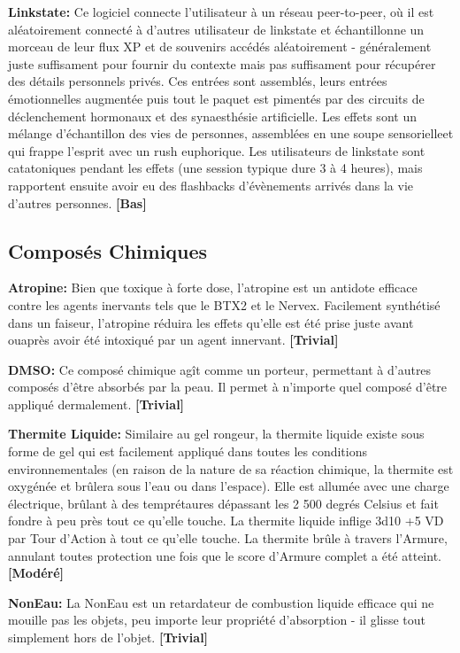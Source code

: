 \textbf{Linkstate:} Ce logiciel connecte l'utilisateur à un réseau peer-to-peer, où il est aléatoirement connecté à d'autres utilisateur de linkstate et échantillonne un morceau de leur flux XP et de souvenirs accédés aléatoirement - généralement juste suffisament pour fournir du contexte mais pas suffisament pour récupérer des détails personnels privés. Ces entrées sont assemblés, leurs entrées émotionnelles augmentée puis tout le paquet est pimentés par des circuits de déclenchement hormonaux et des synaesthésie artificielle. Les effets sont un mélange d'échantillon des vies de personnes, assemblées en une soupe sensorielleet qui frappe l'esprit avec un rush euphorique. Les utilisateurs de linkstate sont catatoniques pendant les effets (une session typique dure 3 à 4 heures), mais rapportent ensuite avoir eu des flashbacks d'évènements arrivés dans la vie d'autres personnes. \textbf{[Bas]} 

\subsection{Composés Chimiques} \label{sec:chemicals} 

\textbf{Atropine:} Bien que toxique à forte dose, l'atropine est un antidote efficace contre les agents inervants tels que le BTX2 et le Nervex. Facilement synthétisé dans un faiseur, l'atropine réduira les effets qu'elle est été prise juste avant ouaprès avoir été intoxiqué par un agent innervant. \textbf{[Trivial]} 

\textbf{DMSO:} Ce composé chimique agît comme un porteur, permettant à d'autres composés d'être absorbés par la peau. Il permet à n'importe quel composé d'être appliqué dermalement. \textbf{[Trivial]} 

\textbf{Thermite Liquide:} Similaire au gel rongeur, la thermite liquide existe sous forme de gel qui est facilement appliqué dans toutes les conditions environnementales (en raison de la nature de sa réaction chimique, la thermite est oxygénée et brûlera sous l'eau ou dans l'espace). Elle est allumée avec une charge électrique, brûlant à des temprétaures dépassant les 2 500 degrés Celsius et fait fondre à peu près tout ce qu'elle touche. La thermite liquide inflige 3d10 +5 VD par Tour d'Action à tout ce qu'elle touche. La thermite brûle à travers l'Armure, annulant toutes protection une fois que le score d'Armure complet a été atteint. \textbf{[Modéré]} 

\textbf{NonEau:} La NonEau est un retardateur de combustion liquide efficace qui ne mouille pas les objets, peu importe leur propriété d'absorption - il glisse tout simplement hors de l'objet. \textbf{[Trivial]} 

